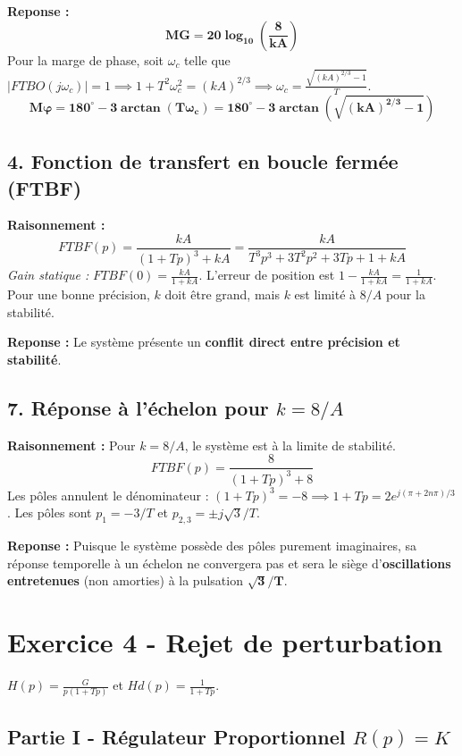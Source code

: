 \documentclass[11pt,a4paper]{article}
\begin{document}
\textbf{Reponse :} 
$$ \mathbf{MG = 20\log_{10}\left(\frac{8}{kA}\right)} $$
Pour la marge de phase, soit $\omega_c$ telle que $|FTBO(j\omega_c)| = 1 \implies 1+T^2\omega_c^2 = (kA)^{2/3} \implies \omega_c = \frac{\sqrt{(kA)^{2/3}-1}}{T}$.
$$ \mathbf{M\varphi = 180^\circ - 3\arctan(T\omega_c) = 180^\circ - 3\arctan\left(\sqrt{(kA)^{2/3}-1}\right)} $$

\subsection*{4. Fonction de transfert en boucle fermée (FTBF)}

\textbf{Raisonnement :} 
$$ FTBF(p) = \frac{kA}{(1+Tp)^3+kA} = \frac{kA}{T^3p^3+3T^2p^2+3Tp+1+kA} $$
\textit{Gain statique :} $FTBF(0) = \frac{kA}{1+kA}$.
L'erreur de position est $1 - \frac{kA}{1+kA} = \frac{1}{1+kA}$. Pour une bonne précision, $k$ doit être grand, mais $k$ est limité à $8/A$ pour la stabilité.

\textbf{Reponse :} Le système présente un \textbf{conflit direct entre précision et stabilité}.

\subsection*{7. Réponse à l'échelon pour $k = 8/A$}

\textbf{Raisonnement :} Pour $k = 8/A$, le système est à la limite de stabilité.
$$ FTBF(p) = \frac{8}{(1+Tp)^3+8} $$
Les pôles annulent le dénominateur : $(1+Tp)^3 = -8 \implies 1+Tp = 2e^{j(\pi+2n\pi)/3}$.
Les pôles sont $p_1 = -3/T$ et $p_{2,3} = \pm j\sqrt{3}/T$.

\textbf{Reponse :} Puisque le système possède des pôles purement imaginaires, sa réponse temporelle à un échelon ne convergera pas et sera le siège d'\textbf{oscillations entretenues} (non amorties) à la pulsation $\mathbf{\sqrt{3}/T}$.

\hrulefill

\section*{Exercice 4 - Rejet de perturbation}

$H(p) = \frac{G}{p(1+Tp)}$ et $Hd(p) = \frac{1}{1+Tp}$.

\subsection*{Partie I - Régulateur Proportionnel $R(p)=K$}
\end{document}
